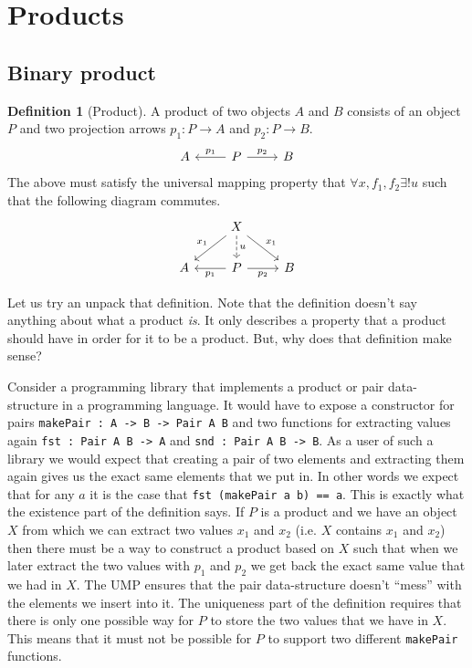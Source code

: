 \documentclass{book}
\theoremstyle{definition}
\newtheorem{definition}{Definition}[section]
\newcommand{\arr}[3]{#1 : #2 \rightarrow #3}
\begin{document}
\section{Products}

\subsection{Binary product}

\begin{definition}[Product]
  A product of two objects $A$ and $B$ consists of an object $P$ and two
  projection arrows $\arr{p_1}{P}{A}$ and $\arr{p_2}{P}{B}$.
  \[
    \begin{tikzcd}
      A & P \arrow[l, "p_1"'] \arrow[r, "p_2"] & B
    \end{tikzcd}
  \]
  The above must satisfy the universal mapping property that $\forall x, f_1,
  f_2 \exists! u$ such that the following diagram commutes.
  \[
    \begin{tikzcd}
      & X \arrow[ld, "x_1"'] \arrow[d, dashrightarrow, "u"] \arrow[rd, "x_1"] \\
      A & P \arrow[l, "p_1"] \arrow[r, "p_2"'] & B
    \end{tikzcd}
  \]
\end{definition}

Let us try an unpack that definition. Note that the definition doesn't say
anything about what a product \emph{is}. It only describes a property that a
product should have in order for it to be a product. But, why does that
definition make sense?

Consider a programming library that implements a product or pair data-structure
in a programming language. It would have to expose a constructor for pairs
\texttt{makePair : A -> B -> Pair A B} and two functions for extracting values
again \texttt{fst : Pair A B -> A} and \texttt{snd : Pair A B -> B}. As a user
of such a library we would expect that creating a pair of two elements and
extracting them again gives us the exact same elements that we put in. In other
words we expect that for any $a$ it is the case that \texttt{fst (makePair a b)
  == a}. This is exactly what the existence part of the definition says. If $P$
is a product and we have an object $X$ from which we can extract two values
$x_1$ and $x_2$ (i.e. $X$ contains $x_1$ and $x_2$) then there must be a way to
construct a product based on $X$ such that when we later extract the two values
with $p_1$ and $p_2$ we get back the exact same value that we had in $X$. The
UMP ensures that the pair data-structure doesn't ``mess'' with the elements we
insert into it. The uniqueness part of the definition requires that there is
only one possible way for $P$ to store the two values that we have in $X$. This
means that it must not be possible for $P$ to support two different
\texttt{makePair} functions.
\end{document}
